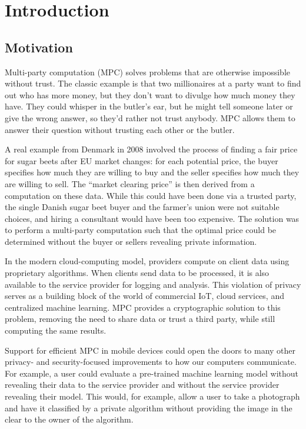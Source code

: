 \section{Introduction}

\subsection{Motivation}
Multi-party computation (MPC) solves problems that are otherwise impossible without trust. The classic example\cite{YaoGC} is that two millionaires at a party want to find out who has more money, but they don't want to divulge how much money they have. They could whisper in the butler's ear, but he might tell someone later or give the wrong answer, so they'd rather not trust anybody. MPC allows them to answer their question without trusting each other or the butler.

A real example from Denmark in 2008 involved the process of finding a fair price for sugar beets after EU market changes: for each potential price, the buyer specifies how much they are willing to buy and the seller specifies how much they are willing to sell. The ``market clearing price'' is then derived from a computation on these data. While this could have been done via a trusted party, the single Danish sugar beet buyer and the farmer's union were not suitable choices, and hiring a consultant would have been too expensive. The solution was to perform a multi-party computation such that the optimal price could be determined without the buyer or sellers revealing private information.\cite{beets}

In the modern cloud-computing model, providers compute on client data using proprietary algorithms. When clients send data to be processed, it is also available to the service provider for logging and analysis. This violation of privacy serves as a building block of the world of commercial IoT, cloud services, and centralized machine learning. MPC provides a cryptographic solution to this problem, removing the need to share data or trust a third party, while still computing the same results.

Support for efficient MPC in mobile devices could open the doors to many other privacy- and security-focused improvements to how our computers communicate. For example, a user could evaluate a pre-trained machine learning model without revealing their data to the service provider and without the service provider revealing their model\cite{NeuralNets}. This would, for example, allow a user to take a photograph and have it classified by a private algorithm without providing the image in the clear to the owner of the algorithm.

